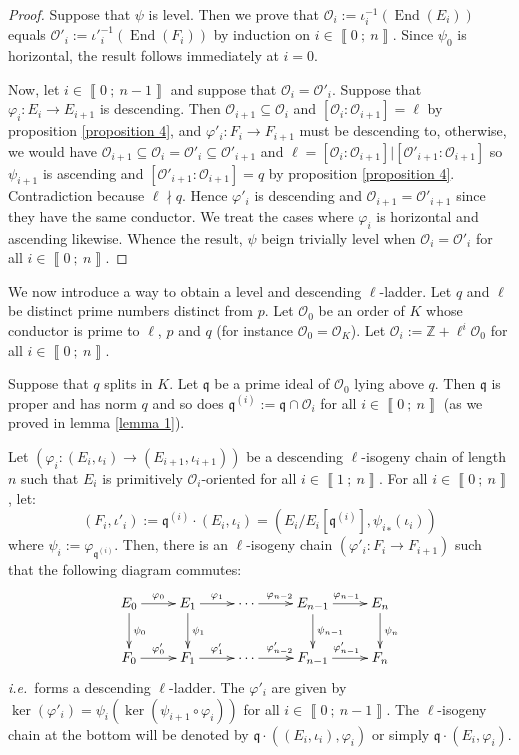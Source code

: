 \documentclass[a4paper,10pt]{report}
\theoremstyle{definition}
\theoremstyle{plain}
\theoremstyle{definition}
\newcommand{\ie}{\emph{i.e.}\ }
\newcommand{\Z}{\mathbb{Z}}
\newcommand{\mO}{\mathcal{O}}
\renewcommand{\i}[2]{\left\llbracket #1~;~#2\right\rrbracket}
\renewcommand{\(}{\left(}
\renewcommand{\)}{\right)}
\newcommand{\mf}[1]{\mathfrak{#1}}
\newcommand{\mfq}{\mathfrak{q}}
\DeclareMathOperator{\End}{End}
\begin{document}
\begin{proof}
Suppose that $\psi$ is level. Then we prove that $\mO_i:=\iota_i^{-1}(\End(E_i))$ equals $\mO'_i:={\iota'}_i^{-1}(\End(F_i))$ by induction on $i\in\i{0}{n}$. Since $\psi_0$ is horizontal, the result follows immediately at $i=0$. 

Now, let $i\in\i{0}{n-1}$ and suppose that $\mO_i=\mO'_i$. Suppose that $\varphi_i : E_i\longrightarrow E_{i+1}$ is descending. Then $\mO_{i+1}\subseteq\mO_i$ and $[\mO_i:\mO_{i+1}]=\ell$ by proposition \ref{proposition 4}, and $\varphi'_i: F_i\longrightarrow F_{i+1}$ must be descending to, otherwise, we would have $\mO_{i+1}\subseteq\mO_i=\mO'_i\subseteq \mO'_{i+1}$ and $\ell=[\mO_i:\mO_{i+1}]|[\mO'_{i+1}:\mO_{i+1}]$ so $\psi_{i+1}$ is ascending and $[\mO'_{i+1}:\mO_{i+1}]=q$ by proposition \ref{proposition 4}. Contradiction because $\ell\nmid q$.  Hence $\varphi'_i$ is descending and $\mO_{i+1}=\mO'_{i+1}$ since they have the same conductor. We treat the cases where $\varphi_i$ is horizontal and ascending likewise. Whence the result, $\psi$ beign trivially level when $\mO_i=\mO'_i$ for all $i\in\i{0}{n}$.
\end{proof}

We now introduce a way to obtain a level and descending $\ell$-ladder. Let $q$ and $\ell$ be distinct prime numbers distinct from $p$. Let $\mO_0$ be an order of $K$ whose conductor is prime to $\ell$,  $p$ and $q$ (for instance $\mO_0=\mO_K$).  Let $\mO_i:=\Z+\ell^i\mO_0$ for all $i\in\i{0}{n}$.

Suppose that $q$ splits in $K$. Let $\mfq$ be a prime ideal of $\mO_0$ lying above $q$. Then $\mfq$ is proper and has norm $q$ and so does $\mfq^{(i)}:=\mfq\cap\mO_i$ for all $i\in\i{0}{n}$ (as we proved in lemma \ref{lemma 1}).

Let $(\varphi_i: (E_i,\iota_i)\longrightarrow (E_{i+1},\iota_{i+1}))$ be a descending $\ell$-isogeny chain of length $n$ such that $E_i$ is primitively $\mO_i$-oriented for all $i\in\i{1}{n}$. For all $i\in\i{0}{n}$, let:
\[(F_i,\iota'_i):=\mfq^{(i)}\cdot(E_i,\iota_i)=(E_i/E_i[\mfq^{(i)}],{\psi_i}_*(\iota_i))\]
where $\psi_i:=\varphi_{\mfq^{(i)}}$. Then, there is an $\ell$-isogeny chain $(\varphi'_i:F_i\longrightarrow F_{i+1})$ such that the following diagram commutes:
\[\xymatrix{
E_0 \ar[d]^{\psi_0} \ar[r]^{\varphi_0} & E_1\ar[d]^{\psi_1} \ar[r]^{\varphi_{1}}& \cdots \ar[r]^{\varphi_{n-2}} & E_{n-1} \ar[d]^{\psi_{n-1}} \ar[r]^{\varphi_{n-1}} & E_n \ar[d]^{\psi_n}\\
F_0 \ar[r]^{\varphi'_0} & F_1 \ar[r]^{\varphi'_{1}}& \cdots \ar[r]^{\varphi'_{n-2}} & F_{n-1} \ar[r]^{\varphi'_{n-1}} & F_n
}\]
\ie forms a descending $\ell$-ladder.  The $\varphi'_i$ are given by $\ker(\varphi'_i)=\psi_i(\ker(\psi_{i+1}\circ\varphi_i))$ for all $i\in\i{0}{n-1}$.  The $\ell$-isogeny chain at the bottom will be denoted by $\mf{q}\cdot((E_i,\iota_i),\varphi_i)$ or simply $\mf{q}\cdot(E_i,\varphi_i)$. 
\end{document}
